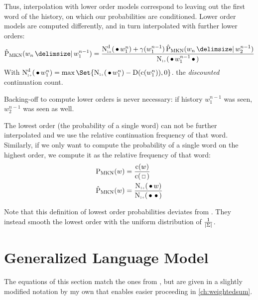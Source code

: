 Thus, interpolation with lower order models correspond to leaving out the first
word of the history, on which our probabilities are conditioned.
Lower order models are computed differently, and in turn interpolated with
further lower orders:
\begin{equation}
  \label{eq:mkn-low}
  \ProbMKN*{w_n}{w_1^{n-1}} =
    \frac{\DiscountedCount*(\WSkp w_1^n) + \gamma(w_1^{n-1}) \ProbMKN*{w_n}{w_2^{n-1}}}
         {\ContCountIp(\WSkp w_1^{n-1} \WSkp)} \\
\end{equation}
With
${\DiscountedCount*(\WSkp w_1^n) = \max\Set{ \ContCountIp(\WSkp w_1^n) - \Discount(\Count(w_1^n)), 0 }}$.
the \emph{discounted} continuation count.

Backing-off to compute lower orders is never necessary:
if history $w_1^{n-1}$ was seen, $w_2^{n-1}$ was seen as well.

The lowest order (the probability of a single word) can not be further
interpolated and we use the relative continuation frequency of that word.
Similarly, if we only want to compute the probability of a single word on the
highest order, we compute it as the relative frequency of that word:
\begin{subequations}
  \label{eq:mkn-lowest}
  \begin{align}
    \label{eq:mkn-lowest-abs}
    \ProbMKN {w} &= \frac{\Count(w)}{\Count(\Skp)} \\
    \label{eq:mkn-lowest-cont}
    \ProbMKN*{w} &= \frac{\ContCountIp(\WSkp w)}{\ContCountIp(\WSkp \WSkp)}
  \end{align}
\end{subequations}

Note that this definition of lowest order probabilities deviates from
\textcite{ChenGoodman1999}.
They instead smooth the lowest order with the uniform distribution of
$\frac{1}{\left|\Sigma\right|}$.


\section{Generalized Language Model}
\label{sec:review-lm-glm}

The equations of this section match the ones from \textcite{Pickhardt2014},
but are given in a slightly modified notation by my own that enables easier
proceeding in \cref{ch:weightedsum}.

